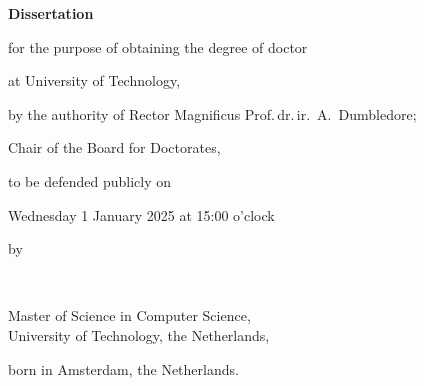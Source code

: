 \begin{titlepage}



\thispagestyle{empty}
\begin{center}

\printtitle

\end{center}

\cleardoublepage




\thispagestyle{empty}
\begin{center}

\printtitle


\vfill

{\Large\titlefont\bfseries Dissertation}

\bigskip
\bigskip

for the purpose of obtaining the degree of doctor

at University of Technology,

by the authority of Rector Magnificus Prof.\,dr.\,ir.\ A.\ Dumbledore;

Chair of the Board for Doctorates,

to be defended publicly on

Wednesday 1 January 2025 at 15:00 o'clock

\bigskip
\bigskip

by

\bigskip
\bigskip

\makeatletter
{\Large\titlefont\bfseries\@firstname\ \textsc{\@lastname}}
\makeatother

\bigskip
\bigskip

Master of Science in Computer Science, \\
University of Technology, the Netherlands,

born in Amsterdam, the Netherlands.

\vspace*{2\bigskipamount}


\end{center}
\end{titlepage}
